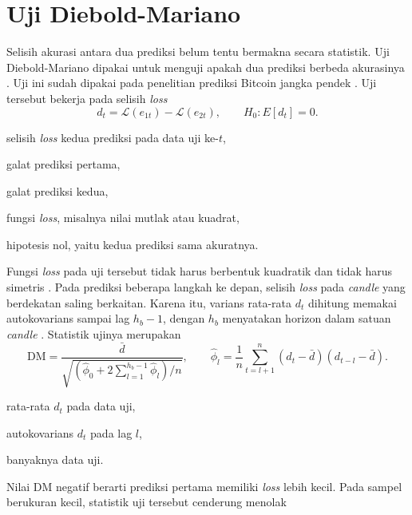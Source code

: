 \section{Uji Diebold-Mariano}
\label{sec:dm}
Selisih akurasi antara dua prediksi belum tentu bermakna secara statistik. Uji
Diebold-Mariano dipakai untuk menguji apakah dua prediksi berbeda akurasinya
\cite{diebold1995}. Uji ini sudah dipakai pada penelitian prediksi Bitcoin
jangka pendek \cite{jaquart2021}. Uji tersebut bekerja pada selisih \textit{loss}
\begin{equation}
  d_t = \mathcal{L}(e_{1t}) - \mathcal{L}(e_{2t}),
  \qquad H_0 : E[d_t] = 0 .
  \label{eq:dmstat}
\end{equation}
\begin{keterangan}
  \item[$d_t$] selisih \textit{loss} kedua prediksi pada data uji ke-$t$,
  \item[$e_{1t}$] galat prediksi pertama,
  \item[$e_{2t}$] galat prediksi kedua,
  \item[$\mathcal{L}(\cdot)$] fungsi \textit{loss}, misalnya nilai mutlak atau kuadrat,
  \item[$H_0$] hipotesis nol, yaitu kedua prediksi sama akuratnya.
\end{keterangan}
Fungsi \textit{loss} pada uji tersebut tidak harus berbentuk kuadratik dan
tidak harus simetris \cite{diebold1995}. Pada prediksi beberapa langkah ke depan, selisih \textit{loss}
pada \textit{candle} yang berdekatan saling berkaitan. Karena itu, varians rata-rata $d_t$ dihitung
memakai autokovarians sampai lag $h_b-1$, dengan $h_b$ menyatakan
horizon dalam satuan \textit{candle} \cite{diebold1995}. Statistik ujinya
merupakan
\begin{equation}
  \text{DM} = \frac{\bar{d}}
    {\sqrt{\left(\hat{\phi}_0 + 2\sum_{l=1}^{h_b-1}\hat{\phi}_l\right)/n}},
  \qquad
  \hat{\phi}_l = \frac{1}{n}\sum_{t=l+1}^{n}(d_t - \bar{d})(d_{t-l} - \bar{d}) .
  \label{eq:dm}
\end{equation}
\begin{keterangan}
  \item[$\bar{d}$] rata-rata $d_t$ pada data uji,
  \item[$\hat{\phi}_l$] autokovarians $d_t$ pada lag $l$,
  \item[$n$] banyaknya data uji.
\end{keterangan}
Nilai DM negatif berarti prediksi pertama memiliki \textit{loss} lebih kecil.
Pada sampel berukuran kecil, statistik uji tersebut cenderung menolak
